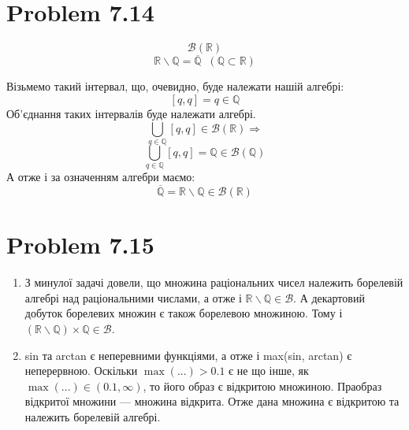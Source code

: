 \documentclass[12pt,letterpaper]{article}
\DeclarePairedDelimiter{\set}{\left\{}{\right\}}
\begin{document}
\section*{Problem 7.14}

\noindent{}

\[ \mathcal{B}(\mathbb{R}) \]
\[ \mathbb{R} \backslash \mathbb{Q} = \overline{\mathbb{Q}} \;\;
    (\mathbb{Q} \subset \mathbb{R})\]

Візьмемо такий інтервал, що, очевидно, буде належати нашій алгебрі:
\[ [q, q] = { q \in \mathbb{Q} } \]
Об'єднання таких інтервалів буде належати алгебрі.
\[ \bigcup\limits_{q \in \mathbb{Q}} [q,q] \in \mathcal{B}(\mathbb{R}) \Rightarrow \]
\[ \bigcup\limits_{q \in \mathbb{Q}} [q,q] = \mathbb{Q} \in \mathcal{B}(\mathbb{Q}) \]
А отже і за означенням алгебри маємо:
\[ \overline{\mathbb{Q}} = \mathbb{R} \backslash \mathbb{Q} \in
    \mathcal{B}(\mathbb{R})\]

\section*{Problem 7.15}

\noindent{}

\begin{enumerate}
    \item З минулої задачі довели, що множина раціональних чисел належить
        борелевій алгебрі над раціональними числами, а отже і
        $\mathbb{R}\backslash\mathbb{Q} \in \mathcal{B}$.
        А декартовий добуток борелевих множин є також борелевою множиною.
        Тому і $ (\mathbb{R}\backslash\mathbb{Q}) \times \mathbb{Q}
                \in \mathcal{B} $.

            \item sin та arctan є неперевними функціями, а отже і max(sin, arctan)
                є неперервною. Оскільки $\max(...) > 0.1$ є не що інше, як
                $\max(...) \in (0.1, \infty)$, то його образ є відкритою множиною.
                Праобраз відкритої множини --- множина відкрита. Отже дана множина
                є відкритою та належить борелевій алгебрі.
\end{enumerate}
\end{document}
